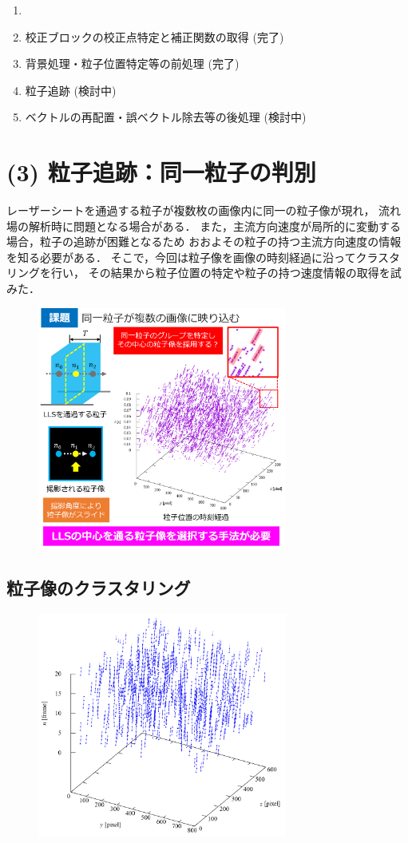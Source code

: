 \documentclass[twocolumn,a4j]{jsarticle}
\begin{document}
\begin{enumerate}[(1)]
	\item [] \textgt{[ 全体の流れ ]}
	\item 校正ブロックの校正点特定と補正関数の取得 (完了)
	\item 背景処理・粒子位置特定等の前処理 (完了)
	\item 粒子追跡 (検討中)
	\item ベクトルの再配置・誤ベクトル除去等の後処理 (検討中)
\end{enumerate}

\section{(3) 粒子追跡：同一粒子の判別}
レーザーシートを通過する粒子が複数枚の画像内に同一の粒子像が現れ，
流れ場の解析時に問題となる場合がある．
また，主流方向速度が局所的に変動する場合，粒子の追跡が困難となるため
おおよその粒子の持つ主流方向速度の情報を知る必要がある．
そこで，今回は粒子像を画像の時刻経過に沿ってクラスタリングを行い，
その結果から粒子位置の特定や粒子の持つ速度情報の取得を試みた．

\begin{figure}[htbp]
	\includegraphics[keepaspectratio, width=82mm]{../images/challenge.png}
\end{figure}

\subsection{粒子像のクラスタリング}
\begin{figure}[htbp]
	\includegraphics[keepaspectratio, width=82mm]{../images/cluster_for_b.png}
\end{figure}
\end{document}
